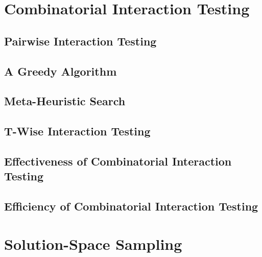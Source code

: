 %

\lessonslearned{
	\item \ldots
}{
	\item \ldots
}{
	\ldots
}

\sectionend

\section{Combinatorial Interaction Testing}

\subsection{Pairwise Interaction Testing}

\subsection{A Greedy Algorithm}

\subsection{Meta-Heuristic Search}

\subsection{T-Wise Interaction Testing}

\subsection{Effectiveness of Combinatorial Interaction Testing}

\subsection{Efficiency of Combinatorial Interaction Testing}

%

\lessonslearned{
	\item \ldots
}{
	\item \ldots
}{
	\ldots
}

\sectionend

\section{Solution-Space Sampling}


